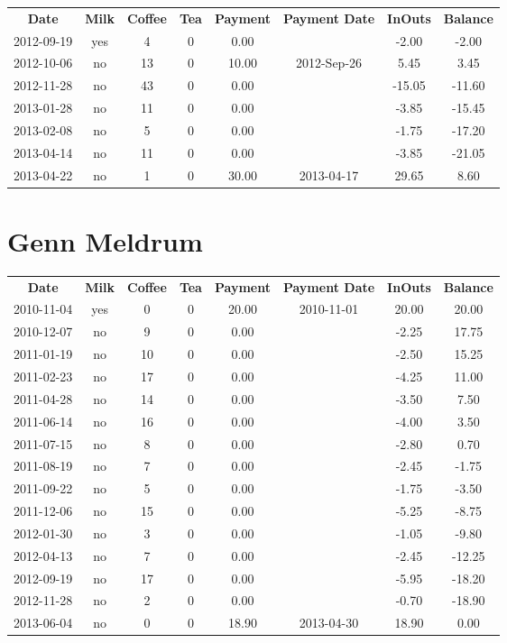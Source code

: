 \begin{center}
\begin{tabular}{cccccccc}
\textbf{Date} & \textbf{Milk} & \textbf{Coffee} & \textbf{Tea} & \textbf{Payment} & \textbf{Payment Date} & \textbf{InOuts} & \textbf{Balance} \\
2012-09-19 & yes &  4 & 0 &  0.00 &  &  -2.00 &  -2.00\\ 
2012-10-06 & no & 13 & 0 & 10.00 & 2012-Sep-26 &   5.45 &   3.45\\ 
2012-11-28 & no & 43 & 0 &  0.00 &  & -15.05 & -11.60\\ 
2013-01-28 & no & 11 & 0 &  0.00 &  &  -3.85 & -15.45\\ 
2013-02-08 & no &  5 & 0 &  0.00 &  &  -1.75 & -17.20\\ 
2013-04-14 & no & 11 & 0 &  0.00 &  &  -3.85 & -21.05\\ 
2013-04-22 & no &  1 & 0 & 30.00 & 2013-04-17 &  29.65 &   8.60
\end{tabular}
\end{center}

\section{Genn Meldrum}

\begin{center}
\begin{tabular}{cccccccc}
\textbf{Date} & \textbf{Milk} & \textbf{Coffee} & \textbf{Tea} & \textbf{Payment} & \textbf{Payment Date} & \textbf{InOuts} & \textbf{Balance} \\
2010-11-04 & yes &  0 & 0 & 20.00 & 2010-11-01 & 20.00 &  20.00\\ 
2010-12-07 & no &  9 & 0 &  0.00 &  & -2.25 &  17.75\\ 
2011-01-19 & no & 10 & 0 &  0.00 &  & -2.50 &  15.25\\ 
2011-02-23 & no & 17 & 0 &  0.00 &  & -4.25 &  11.00\\ 
2011-04-28 & no & 14 & 0 &  0.00 &  & -3.50 &   7.50\\ 
2011-06-14 & no & 16 & 0 &  0.00 &  & -4.00 &   3.50\\ 
2011-07-15 & no &  8 & 0 &  0.00 &  & -2.80 &   0.70\\ 
2011-08-19 & no &  7 & 0 &  0.00 &  & -2.45 &  -1.75\\ 
2011-09-22 & no &  5 & 0 &  0.00 &  & -1.75 &  -3.50\\ 
2011-12-06 & no & 15 & 0 &  0.00 &  & -5.25 &  -8.75\\ 
2012-01-30 & no &  3 & 0 &  0.00 &  & -1.05 &  -9.80\\ 
2012-04-13 & no &  7 & 0 &  0.00 &  & -2.45 & -12.25\\ 
2012-09-19 & no & 17 & 0 &  0.00 &  & -5.95 & -18.20\\ 
2012-11-28 & no &  2 & 0 &  0.00 &  & -0.70 & -18.90\\ 
2013-06-04 & no &  0 & 0 & 18.90 & 2013-04-30 & 18.90 &   0.00
\end{tabular}
\end{center}

